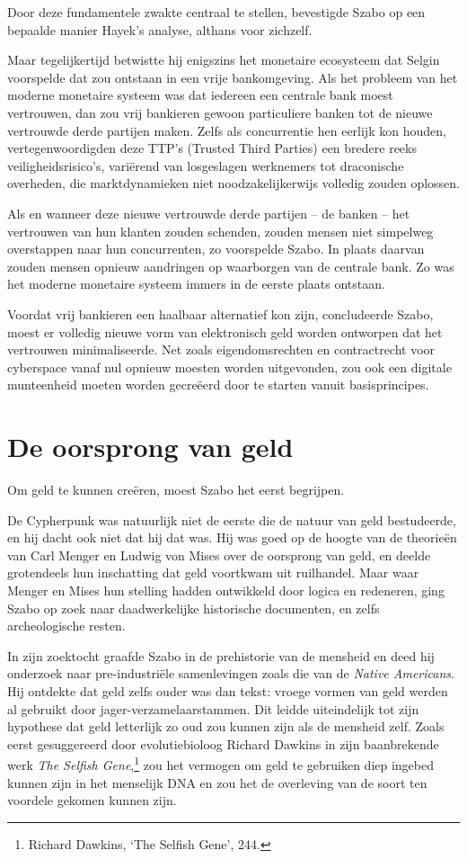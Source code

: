 \documentclass[smalldemyvopaper,11pt,twoside,onecolumn,openright,extrafontsizes,hidelinks]{memoir}
\begin{document}
Door deze fundamentele zwakte centraal te stellen, bevestigde Szabo op
een bepaalde manier Hayek's analyse, althans voor zichzelf.

Maar tegelijkertijd betwistte hij enigszins het monetaire ecosysteem dat
Selgin voorspelde dat zou ontstaan in een vrije bankomgeving. Als het
probleem van het moderne monetaire systeem was dat iedereen een centrale
bank moest vertrouwen, dan zou vrij bankieren gewoon particuliere banken
tot de nieuwe vertrouwde derde partijen maken. Zelfs als concurrentie
hen eerlijk kon houden, vertegenwoordigden deze TTP's (Trusted Third
Parties) een bredere reeks veiligheidsrisico's, variërend van
losgeslagen werknemers tot draconische overheden, die marktdynamieken
niet noodzakelijkerwijs volledig zouden oplossen.

Als en wanneer deze nieuwe vertrouwde derde partijen -- de banken -- het
vertrouwen van hun klanten zouden schenden, zouden mensen niet simpelweg
overstappen naar hun concurrenten, zo voorspelde Szabo. In plaats
daarvan zouden mensen opnieuw aandringen op waarborgen van de centrale
bank. Zo was het moderne monetaire systeem immers in de eerste plaats
ontstaan.

Voordat vrij bankieren een haalbaar alternatief kon zijn, concludeerde
Szabo, moest er volledig nieuwe vorm van elektronisch geld worden
ontworpen dat het vertrouwen minimaliseerde. Net zoals eigendomsrechten
en contractrecht voor cyberspace vanaf nul opnieuw moesten worden
uitgevonden, zou ook een digitale munteenheid moeten worden gecreëerd
door te starten vanuit basisprincipes.

\section{De oorsprong van geld}\label{de-oorsprong-van-geld}

Om geld te kunnen creëren, moest Szabo het eerst begrijpen.

De Cypherpunk was natuurlijk niet de eerste die de natuur van geld
bestudeerde, en hij dacht ook niet dat hij dat was. Hij was goed op de
hoogte van de theorieën van Carl Menger en Ludwig von Mises over de
oorsprong van geld, en deelde grotendeels hun inschatting dat geld
voortkwam uit ruilhandel. Maar waar Menger en Mises hun stelling hadden
ontwikkeld door logica en redeneren, ging Szabo op zoek naar
daadwerkelijke historische documenten, en zelfs archeologische resten.

In zijn zoektocht graafde Szabo in de prehistorie van de mensheid en
deed hij onderzoek naar pre-industriële samenlevingen zoals die van de
\emph{Native Americans}. Hij ontdekte dat geld zelfs ouder was dan
tekst: vroege vormen van geld werden al gebruikt door
jager-verzamelaarstammen. Dit leidde uiteindelijk tot zijn hypothese dat
geld letterlijk zo oud zou kunnen zijn als de mensheid zelf. Zoals eerst
gesuggereerd door evolutiebioloog Richard Dawkins in zijn baanbrekende
werk \emph{The Selfish Gene},\footnote{Richard Dawkins, `The Selfish
  Gene', 244.} zou het vermogen om geld te gebruiken diep ingebed kunnen
zijn in het menselijk DNA en zou het de overleving van de soort ten
voordele gekomen kunnen zijn.
\end{document}
